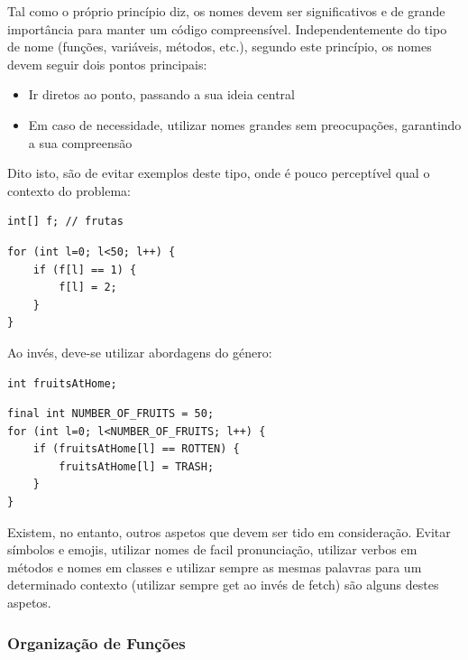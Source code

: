 \documentclass[10pt,portuguese]{article}
\begin{document}
\par Tal como o próprio princípio diz, os nomes devem ser significativos e de grande importância para manter um código compreensível. Independentemente do tipo de nome (funções, variáveis, métodos, etc.), segundo este princípio, os nomes devem seguir dois pontos principais:

\begin{itemize}
    \item Ir diretos ao ponto, passando a sua ideia central
    \item Em caso de necessidade, utilizar nomes grandes sem preocupações, garantindo a sua compreensão
\end{itemize}

\clearpage

\par Dito isto, são de evitar exemplos deste tipo, onde é pouco perceptível qual o contexto do problema:

\begin{lstlisting}
int[] f; // frutas
\end{lstlisting}

\begin{lstlisting}
for (int l=0; l<50; l++) {
	if (f[l] == 1) {
	    f[l] = 2;
	}
}
\end{lstlisting}

\par Ao invés, deve-se utilizar abordagens do género:

\begin{lstlisting}
int fruitsAtHome;
\end{lstlisting}

\begin{lstlisting}
final int NUMBER_OF_FRUITS = 50;
for (int l=0; l<NUMBER_OF_FRUITS; l++) {
	if (fruitsAtHome[l] == ROTTEN) {
	    fruitsAtHome[l] = TRASH;
	}
}
\end{lstlisting}

\par Existem, no entanto, outros aspetos que devem ser tido em consideração. Evitar símbolos e emojis, utilizar nomes de facil pronunciação, utilizar verbos em métodos e nomes em classes e utilizar sempre as mesmas palavras para um determinado contexto (utilizar sempre get ao invés de fetch) são alguns destes aspetos.

\subsubsection{Organização de Funções}
\end{document}
